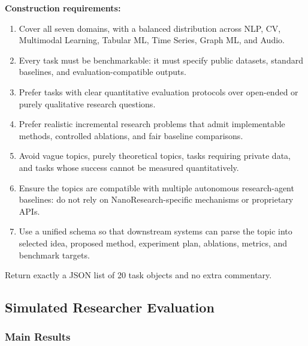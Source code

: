 \documentclass{opendatalab}
\begin{document}
\begin{tcolorbox}
\medskip
\textbf{Construction requirements:}
\begin{enumerate}\setlength\itemsep{1pt}
  \item Cover all seven domains, with a balanced distribution across NLP, CV, Multimodal Learning, Tabular ML, Time Series, Graph ML, and Audio.
  \item Every task must be benchmarkable: it must specify public datasets, standard baselines, and evaluation-compatible outputs.
  \item Prefer tasks with clear quantitative evaluation protocols over open-ended or purely qualitative research questions.
  \item Prefer realistic incremental research problems that admit implementable methods, controlled ablations, and fair baseline comparisons.
  \item Avoid vague topics, purely theoretical topics, tasks requiring private data, and tasks whose success cannot be measured quantitatively.
  \item Ensure the topics are compatible with multiple autonomous research-agent baselines: do not rely on NanoResearch-specific mechanisms or proprietary APIs.
  \item Use a unified schema so that downstream systems can parse the topic into selected idea, proposed method, experiment plan, ablations, metrics, and benchmark targets.
\end{enumerate}

\medskip
Return exactly a JSON list of 20 task objects and no extra commentary.
\end{tcolorbox}

\subsection{Simulated Researcher Evaluation}

\subsubsection{Main Results}


\end{document}
